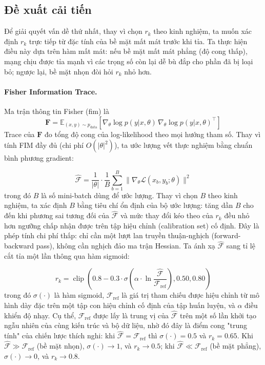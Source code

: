         \subsection{Đề xuất cải tiến}
            Để giải quyết vấn dề thứ nhất, thay vì chọn $r_k$ theo kinh nghiệm, ta muốn xác định $r_k$ trực tiếp từ đặc tính của bề mặt mất mát trước khi tỉa. Ta thực hiện điều này dựa trên hàm mất mát: nếu bề mặt mất mát phẳng (độ cong thấp), mạng chịu được tỉa mạnh vì các trọng số còn lại dễ bù đắp cho phần đã bị loại bỏ; ngược lại, bề mặt nhọn đòi hỏi $r_k$ nhỏ hơn.

            \paragraph{Fisher Information Trace.}
            Ma trận thông tin Fisher (\gls{fim}) là $$\mathbf{F} = \mathbb{E}_{(x,y)\sim p_\text{data}}\left[\nabla_\theta \log p(y|x,\theta)\,\nabla_\theta \log p(y|x,\theta)^\top\right]$$
            Trace của $\mathbf{F}$ đo tổng độ cong của log-likelihood theo mọi hướng tham số. Thay vì tính FIM đầy đủ (chi phí $O(|\theta|^2)$), ta ước lượng vết thực nghiệm bằng chuẩn bình phương gradient:

            \begin{equation}
                \hat{\mathcal{F}} = \frac{1}{|\theta|} \cdot \frac{1}{B} \sum_{b=1}^{B} \lVert \nabla_\theta \mathcal{L}(x_b, y_b; \theta) \rVert^2
                \label{eq:fisher_trace}
            \end{equation}
            trong đó $B$ là số mini-batch dùng để ước lượng. Thay vì chọn $B$ theo kinh nghiệm, ta xác định $B$ bằng tiêu chí ổn định của bộ ước lượng: tăng dần $B$ cho đến khi phương sai tương đối của $\hat{\mathcal{F}}$ và mức thay đổi kéo theo của $r_k$ đều nhỏ hơn ngưỡng chấp nhận được trên tập hiệu chỉnh (calibration set) cố định. Đây là phép tính chi phí thấp: chỉ cần một lượt lan truyền thuận-nghịch (forward-backward pass), không cần nghịch đảo ma trận Hessian.
            Ta ánh xạ $\hat{\mathcal{F}}$ sang tỉ lệ cắt tỉa một lần thông qua hàm sigmoid:
             
            \begin{equation}
                r_k = \operatorname{clip}\left(0.8 - 0.3 \cdot \sigma\left(\alpha \cdot \ln\frac{\hat{\mathcal{F}}}{\mathcal{F}_{\text{ref}}}\right), 0.50, 0.80\right)
                \label{eq:adaptive_rk}
            \end{equation}
            trong đó $\sigma(\cdot)$ là hàm sigmoid, $\mathcal{F}_\text{ref}$ là giá trị tham chiếu được hiệu chỉnh từ mô hình dày đặc trên một tập con hiệu chỉnh cố định của tập huấn luyện, và $\alpha$ điều khiển độ nhạy. Cụ thể, $\mathcal{F}_\text{ref}$ được lấy là trung vị của $\hat{\mathcal{F}}$ trên một số lần khởi tạo ngẫu nhiên của cùng kiến trúc và bộ dữ liệu, nhờ đó đây là điểm cong "trung tính" của chiến lược thích nghi: khi $\hat{\mathcal{F}} = \mathcal{F}_\text{ref}$ thì $\sigma(\cdot)=0.5$ và $r_k = 0.65$. Khi $\hat{\mathcal{F}} \gg \mathcal{F}_\text{ref}$ (bề mặt nhọn), $\sigma(\cdot) \to 1$, và $r_k \to 0.5$; khi $\hat{\mathcal{F}} \ll \mathcal{F}_\text{ref}$ (bề mặt phẳng), $\sigma(\cdot) \to 0$, và $r_k \to 0.8$.
            

